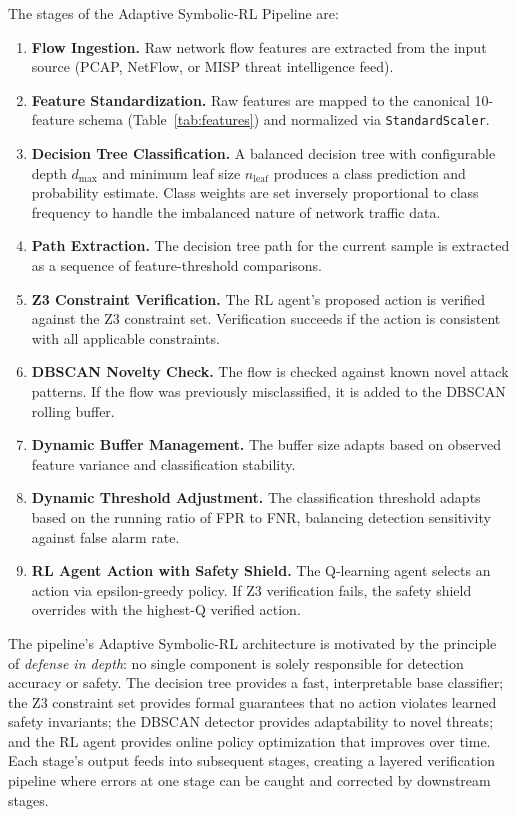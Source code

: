 \documentclass[12pt, letterpaper, oneside]{report}
\begin{document}
\noindent The stages of the Adaptive Symbolic-RL Pipeline are:
\begin{enumerate}[label=\textbf{Stage \arabic*:}, start=0]
    \item \textbf{Flow Ingestion.} Raw network flow features are extracted from the input source (PCAP, NetFlow, or MISP threat intelligence feed).
    \item \textbf{Feature Standardization.} Raw features are mapped to the canonical 10-feature schema (Table~\ref{tab:features}) and normalized via \texttt{StandardScaler}.
    \item \textbf{Decision Tree Classification.} A balanced decision tree with configurable depth $d_{\max}$ and minimum leaf size $n_{\text{leaf}}$ produces a class prediction and probability estimate. Class weights are set inversely proportional to class frequency to handle the imbalanced nature of network traffic data.
    \item \textbf{Path Extraction.} The decision tree path for the current sample is extracted as a sequence of feature-threshold comparisons.
    \item \textbf{Z3 Constraint Verification.} The RL agent's proposed action is verified against the Z3 constraint set. Verification succeeds if the action is consistent with all applicable constraints.
    \item \textbf{DBSCAN Novelty Check.} The flow is checked against known novel attack patterns. If the flow was previously misclassified, it is added to the DBSCAN rolling buffer.
    \item \textbf{Dynamic Buffer Management.} The buffer size adapts based on observed feature variance and classification stability.
    \item \textbf{Dynamic Threshold Adjustment.} The classification threshold adapts based on the running ratio of FPR to FNR, balancing detection sensitivity against false alarm rate.
    \item \textbf{RL Agent Action with Safety Shield.} The Q-learning agent selects an action via epsilon-greedy policy. If Z3 verification fails, the safety shield overrides with the highest-Q verified action.
\end{enumerate}

\noindent The pipeline's Adaptive Symbolic-RL architecture is motivated by the principle of \emph{defense in depth}: no single component is solely responsible for detection accuracy or safety. The decision tree provides a fast, interpretable base classifier; the Z3 constraint set provides formal guarantees that no action violates learned safety invariants; the DBSCAN detector provides adaptability to novel threats; and the RL agent provides online policy optimization that improves over time. Each stage's output feeds into subsequent stages, creating a layered verification pipeline where errors at one stage can be caught and corrected by downstream stages.
\end{document}
